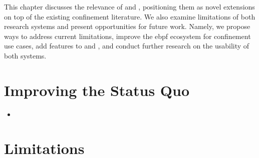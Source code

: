 This chapter discusses the relevance of \bpfbox{} and \bpfcontain{}, positioning them as
novel extensions on top of the existing confinement literature. We also examine
limitations of both research systems and present opportunities for future work. Namely, we
propose ways to address current limitations, improve the \gls{ebpf} ecosystem for
confinement use cases, add features to \bpfbox{} and \bpfcontain{}, and conduct further
research on the usability of both systems.

\section{Improving the Status Quo}%
\label{s:disc-improving}



\begin{inprogress}
  \begin{itemize}
    \item
  \end{itemize}
\end{inprogress}


\section{Limitations}%
\label{s:disc-limitations}


